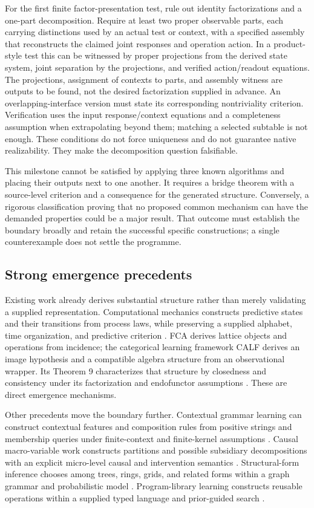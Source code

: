 \documentclass[11pt]{article}
\theoremstyle{remark}
\begin{document}
For the first finite factor-presentation test, rule out identity factorizations and a one-part decomposition. Require at least two proper observable parts, each carrying distinctions used by an actual test or context, with a specified assembly that reconstructs the claimed joint responses and operation action. In a product-style test this can be witnessed by proper projections from the derived state system, joint separation by the projections, and verified action/readout equations. The projections, assignment of contexts to parts, and assembly witness are outputs to be found, not the desired factorization supplied in advance. An overlapping-interface version must state its corresponding nontriviality criterion. Verification uses the input response/context equations and a completeness assumption when extrapolating beyond them; matching a selected subtable is not enough. These conditions do not force uniqueness and do not guarantee native realizability. They make the decomposition question falsifiable.

This milestone cannot be satisfied by applying three known algorithms and placing their outputs next to one another. It requires a bridge theorem with a source-level criterion and a consequence for the generated structure. Conversely, a rigorous classification proving that no proposed common mechanism can have the demanded properties could be a major result. That outcome must establish the boundary broadly and retain the successful specific constructions; a single counterexample does not settle the programme.

\subsection{Strong emergence precedents}

Existing work already derives substantial structure rather than merely validating a supplied representation. Computational mechanics constructs predictive states and their transitions from process laws, while preserving a supplied alphabet, time organization, and predictive criterion \cite{ComputationalMechanics}. FCA derives lattice objects and operations from incidence; the categorical learning framework CALF derives an image hypothesis and a compatible algebra structure from an observational wrapper. Its Theorem 9 characterizes that structure by closedness and consistency under its factorization and endofunctor assumptions \cite{FCA,CALF}. These are direct emergence mechanisms.

Other precedents move the boundary further. Contextual grammar learning can construct contextual features and composition rules from positive strings and membership queries under finite-context and finite-kernel assumptions \cite{ContextualGrammar}. Causal macro-variable work constructs partitions and possible subsidiary decompositions with an explicit micro-level causal and intervention semantics \cite{MacroVariables}. Structural-form inference chooses among trees, rings, grids, and related forms within a graph grammar and probabilistic model \cite{StructuralForm}. Program-library learning constructs reusable operations within a supplied typed language and prior-guided search \cite{DreamCoder}.
\end{document}
